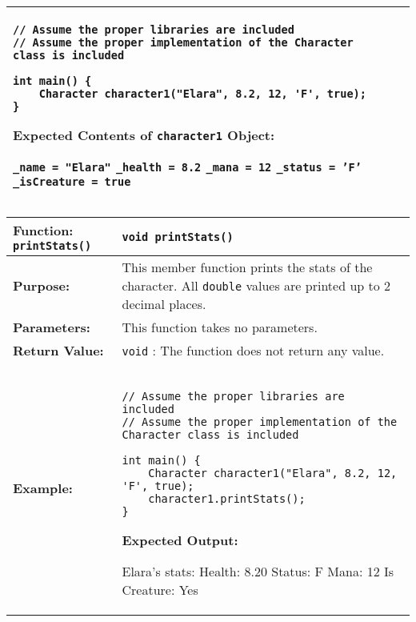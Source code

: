 \begin{longtable}{|p{1.7in}|p{4.3in}|}
\begin{example}
\begin{verbatim}
// Assume the proper libraries are included
// Assume the proper implementation of the Character class is included

int main() {
    Character character1("Elara", 8.2, 12, 'F', true);
}
\end{verbatim}
\end{example}

\textbf{Expected Contents of \texttt{character1} Object:} 

\vspace{5pt}
\texttt{_name = "Elara"} \newline
\texttt{_health = 8.2} \newline
\texttt{_mana = 12} \newline
\texttt{_status = 'F'} \newline
\texttt{_isCreature = true}
\vspace{5pt} \\ \hline
\end{longtable}


\renewcommand{\arraystretch}{1.5}
\begin{longtable}{|p{1.7in}|p{4.3in}|}
\hline
\textbf{Function:} \texttt{printStats()} & \texttt{void printStats()} \\ \hline

\textbf{Purpose:} & This member function prints the stats of the character. All \texttt{double} values are printed up to 2 decimal places. \\ \hline

\textbf{Parameters:} & 
This function takes no parameters. \\ \hline

\textbf{Return Value:} & 
\texttt{void} : The function does not return any value. \\ \hline

\textbf{Example:} & 

\begin{example}

\begin{verbatim}

// Assume the proper libraries are included
// Assume the proper implementation of the Character class is included

int main() {
    Character character1("Elara", 8.2, 12, 'F', true);
    character1.printStats();
}
\end{verbatim}
\end{example}

\textbf{Expected Output:} 

\vspace{5pt}
Elara's stats: \newline
Health: 8.20 \newline
Status: F \newline
Mana: 12 \newline
Is Creature: Yes
\vspace{5pt} \\ \hline
\end{longtable}

